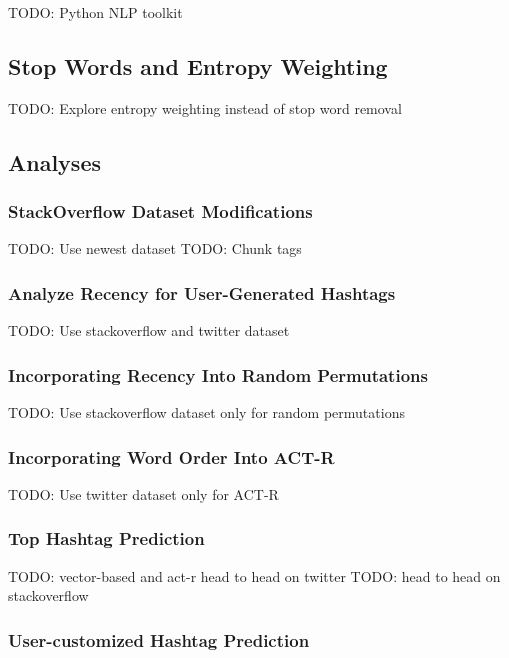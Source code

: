\documentclass[man]{apa6}
\begin{document}
TODO: Python NLP toolkit \cite{Bird2009}

\subsection{Stop Words and Entropy Weighting}

TODO: Explore entropy weighting instead of stop word removal \cite{Dumais1991}

\subsection{Analyses}

\subsubsection{StackOverflow Dataset Modifications}

TODO: Use newest dataset
TODO: Chunk tags

\subsubsection{Analyze Recency for User-Generated Hashtags}

TODO: Use stackoverflow and twitter dataset

\subsubsection{Incorporating Recency Into Random Permutations}

TODO: Use stackoverflow dataset only for random permutations

\subsubsection{Incorporating Word Order Into ACT-R}

TODO: Use twitter dataset only for ACT-R

\subsubsection{Top Hashtag Prediction}

TODO: vector-based and act-r head to head on twitter
TODO: head to head on stackoverflow

\subsubsection{User-customized Hashtag Prediction}

\printbibliography
\end{document}

